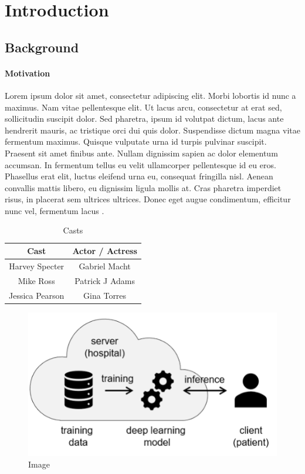 \chapter{Introduction}

\section{Background}

\subsubsection{Motivation}

Lorem ipsum dolor sit amet, consectetur adipiscing elit. Morbi lobortis id nunc a maximus. Nam vitae pellentesque elit. Ut lacus arcu, consectetur at erat sed, sollicitudin suscipit dolor. Sed pharetra, ipsum id volutpat dictum, lacus ante hendrerit mauris, ac tristique orci dui quis dolor. Suspendisse dictum magna vitae fermentum maximus. Quisque vulputate urna id turpis pulvinar suscipit. Praesent sit amet finibus ante. Nullam dignissim sapien ac dolor elementum accumsan. In fermentum tellus eu velit ullamcorper pellentesque id eu eros. Phasellus erat elit, luctus eleifend urna eu, consequat fringilla nisl. Aenean convallis mattis libero, eu dignissim ligula mollis at. Cras pharetra imperdiet risus, in placerat sem ultrices ultrices. Donec eget augue condimentum, efficitur nunc vel, fermentum lacus \cite{book}.

\begin{table}[!ht]
    \centering
    \begin{tabular}{@{}cc@{}}
    \toprule
    Cast            & Actor / Actress \\ \midrule
    Harvey Specter  & Gabriel Macht   \\
    Mike Ross       & Patrick J Adams \\
    Jessica Pearson & Gina Torres     \\ \bottomrule
    \end{tabular}
    \caption{Casts}
\end{table}

\begin{figure}[!ht]
    \centering
    \includegraphics{figures/diag.png}
    \caption{Image}
\end{figure}

